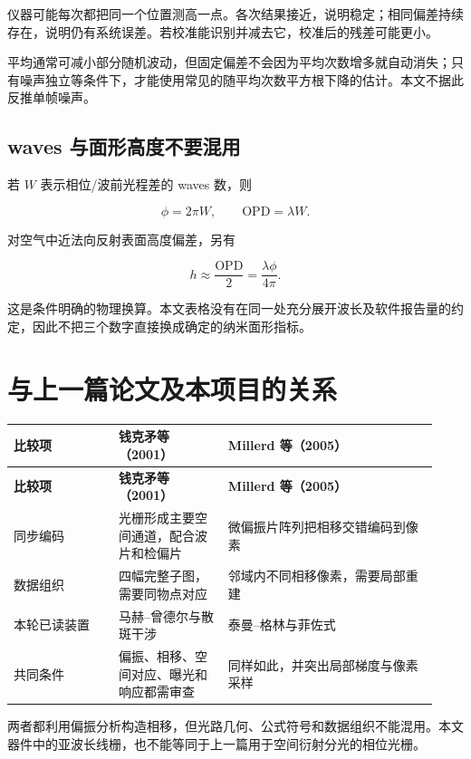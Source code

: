 \documentclass[UTF8,fontset=fandol,11pt,a4paper]{ctexart}
\begin{document}
仪器可能每次都把同一个位置测高一点。各次结果接近，说明稳定；相同偏差持续存在，说明仍有系统误差。若校准能识别并减去它，校准后的残差可能更小。

平均通常可减小部分随机波动，但固定偏差不会因为平均次数增多就自动消失；只有噪声独立等条件下，才能使用常见的随平均次数平方根下降的估计。本文不据此反推单帧噪声。

\subsection{waves 与面形高度不要混用}

若 \(W\) 表示相位/波前光程差的 waves 数，则

\[
\phi=2\pi W,\qquad \mathrm{OPD}=\lambda W.
\]

对空气中近法向反射表面高度偏差，另有

\[
h\approx\frac{\mathrm{OPD}}2=\frac{\lambda\phi}{4\pi}.
\]

这是条件明确的物理换算。本文表格没有在同一处充分展开波长及软件报告量的约定，因此不把三个数字直接换成确定的纳米面形指标。

\section{与上一篇论文及本项目的关系}

{\small
\begin{longtable}{>{\raggedright\arraybackslash}p{0.23\linewidth}>{\raggedright\arraybackslash}p{0.24\linewidth}>{\raggedright\arraybackslash}p{0.46\linewidth}}
\toprule
\textbf{比较项} & \textbf{钱克矛等（2001）} & \textbf{Millerd 等（2005）} \\
\midrule
\endfirsthead
\toprule
\textbf{比较项} & \textbf{钱克矛等（2001）} & \textbf{Millerd 等（2005）} \\
\midrule
\endhead
同步编码 & 光栅形成主要空间通道，配合波片和检偏片 & 微偏振片阵列把相移交错编码到像素 \\
数据组织 & 四幅完整子图，需要同物点对应 & 邻域内不同相移像素，需要局部重建 \\
本轮已读装置 & 马赫–曾德尔与散斑干涉 & 泰曼–格林与菲佐式 \\
共同条件 & 偏振、相移、空间对应、曝光和响应都需审查 & 同样如此，并突出局部梯度与像素采样 \\
\bottomrule
\end{longtable}
}

两者都利用偏振分析构造相移，但光路几何、公式符号和数据组织不能混用。本文器件中的亚波长线栅，也不能等同于上一篇用于空间衍射分光的相位光栅。
\end{document}
